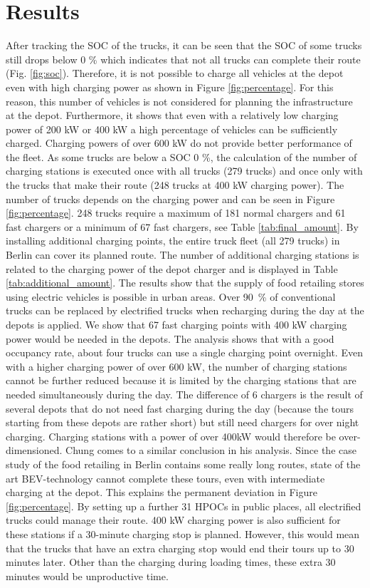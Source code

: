 \documentclass[3p,times,procedia]{elsarticle}
\begin{document}
\section{Results}
\label{results}
After tracking the SOC of the trucks, it can be seen that the SOC of some trucks still drops below 0 \% which indicates that not all trucks can complete their route (Fig. \ref{fig:soc}). Therefore, it is not possible to charge all vehicles at the depot even with high charging power as shown in Figure \ref{fig:percentage}. For this reason, this number of vehicles is not considered for planning the infrastructure at the depot. Furthermore, it shows that even with a relatively low charging power of 200 kW or 400 kW a high percentage of vehicles can be sufficiently charged. Charging powers of over 600 kW do not provide better performance of the fleet. As some trucks are below a SOC 0 \%, the calculation of the number of charging stations is executed once with all trucks (279 trucks) and once only with the trucks that make their route (248 trucks at 400 kW charging power). The number of trucks depends on the charging power and can be seen in Figure \ref{fig:percentage}. 248 trucks require a maximum of 181 normal chargers and 61 fast chargers or a minimum of 67 fast chargers, see Table \ref{tab:final_amount}. By installing additional charging points, the entire truck fleet (all 279 trucks) in Berlin can cover its planned route. The number of additional charging stations is related to the charging power of the depot charger and is displayed in Table \ref{tab:additional_amount}. The results show that the supply of food retailing stores using electric vehicles is possible in urban areas. Over 90~\% of conventional trucks can be replaced by electrified trucks when recharging during the day at the depots is applied.
We show that 67 fast charging points with 400 kW charging power would be needed in the depots. The analysis shows that with a good occupancy rate, about four trucks can use a single charging point overnight. Even with a higher charging power of over 600 kW, the number of charging stations cannot be further reduced because it is limited by the charging stations that are needed simultaneously during the day. The difference of 6 chargers is the result of several depots that do not need fast charging during the day (because the tours starting from these depots are rather short) but still need chargers for over night charging. Charging stations with a power of over 400kW  would therefore be over-dimensioned. Chung \cite{Chung.20200928} comes to a similar conclusion in his analysis.
Since the case study of the food retailing in Berlin contains some really long routes, state of the art BEV-technology cannot complete these tours, even with intermediate charging at the depot. This explains the permanent deviation in Figure \ref{fig:percentage}. By setting up a further 31 HPOCs in public places, all electrified trucks could manage their route. 400 kW charging power is also sufficient for these stations if a 30-minute charging stop is planned. However, this would mean that the trucks that have an extra charging stop would end their tours up to 30 minutes later. Other than the charging during loading times, these extra 30 minutes would be unproductive time.
\end{document}
